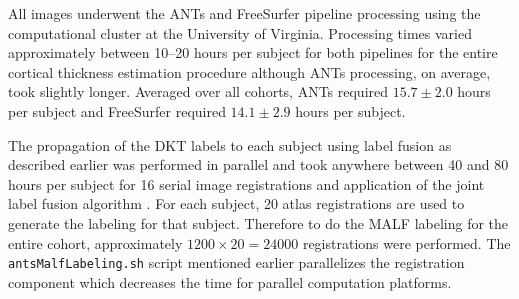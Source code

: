 All images underwent the ANTs and FreeSurfer pipeline processing 
using the computational cluster at the University of Virginia.  
Processing times varied approximately between 10--20 hours per subject
for both pipelines for the entire cortical thickness estimation procedure
although ANTs processing, on average, took slightly longer.  Averaged over all cohorts, ANTs required 
$15.7 \pm 2.0 $ hours per subject and FreeSurfer required $14.1 \pm 2.9$ hours per subject.

The propagation of the DKT labels to each subject using label fusion as described earlier
was performed in parallel and took anywhere between 40 and 80 hours per 
subject for 16 serial image registrations and application of the joint label fusion algorithm \citep{wang2013}. 
For each subject, 20 atlas registrations are used to generate the labeling 
for that subject.  Therefore to do the MALF labeling for the entire cohort, approximately 
$1200 \times 20 = 24000$ registrations were performed.  
The {\tt antsMalfLabeling.sh} script mentioned earlier parallelizes
the registration component which decreases the time for parallel computation platforms.
 
 
 


